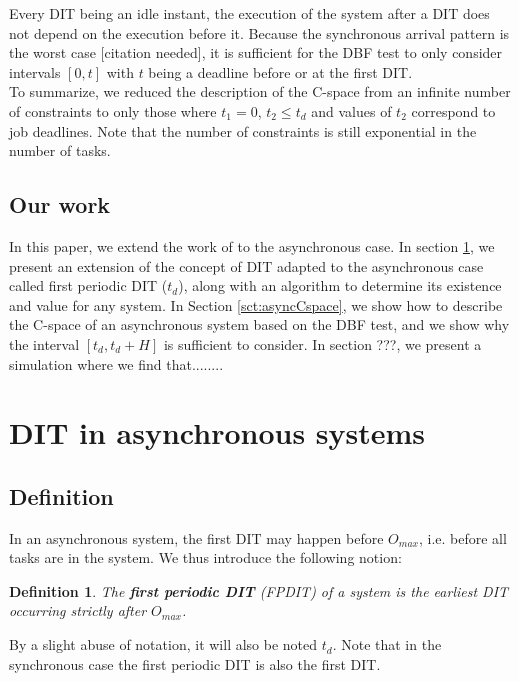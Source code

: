 \documentclass[times, 10pt,twocolumn, a4paper]{article}
\newtheorem{definition}{Definition}
\begin{document}
	Every DIT being an idle instant, the execution of the system after a DIT does
	not depend on the execution before it. Because the synchronous arrival pattern is
	the worst case [citation needed], it is sufficient for the DBF test to only
	consider intervals $[0, t]$ with $t$ being a deadline before or at the first DIT.\\

	To summarize, we reduced the description of the C-space from an infinite number
	of constraints to only those where $t_1 = 0$, $t_2 \leqslant t_d$ and
	values of $t_2$ correspond to job deadlines. Note that the number of
	constraints is still exponential in the number of tasks.

	\subsection{Our work}
		In this paper, we extend the work of \cite{george2009characterization} to the
		asynchronous case. In section \ref{sct:asyncDIT}, we present an extension of
		the concept of DIT adapted to the asynchronous case called first periodic DIT
		($t_d$), along with an algorithm to determine its existence and value for any system. In Section
		\ref{sct:asyncCspace}, we show how to describe the C-space of an asynchronous
		system based on the DBF test, and we show why the interval $[t_d, t_d + H]$ is
		sufficient to consider. In section ???, we present a simulation where we find that........

\section{DIT in asynchronous systems}
	\label{sct:asyncDIT}

	\subsection{Definition}

		In an asynchronous system, the first DIT may happen before $O_{max}$, i.e. before all tasks are in the system. We thus introduce the following notion:

		\begin{definition}
			The \textbf{first periodic DIT} (FPDIT) of a system is the earliest DIT occurring
			strictly after $O_{max}$.
		\end{definition}

		By a slight abuse of notation, it will also be noted $t_d$. Note that in the
		synchronous case the first periodic DIT is also the first DIT.
\end{document}
